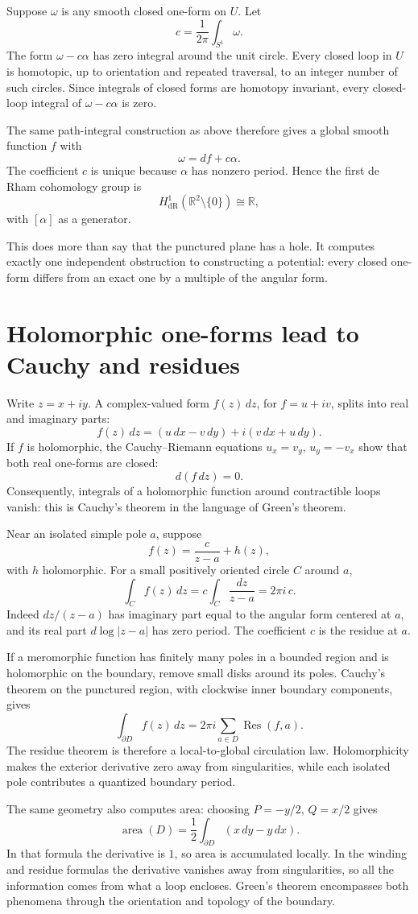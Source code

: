 Suppose \(\omega\) is any smooth closed one-form on \(U\). Let
\[
 c=\frac1{2\pi}\int_{S^1}\omega.
\]
The form \(\omega-c\alpha\) has zero integral around the unit circle. Every closed loop in \(U\) is homotopic, up to orientation and repeated traversal, to an integer number of such circles. Since integrals of closed forms are homotopy invariant, every closed-loop integral of \(\omega-c\alpha\) is zero.

The same path-integral construction as above therefore gives a global smooth function \(f\) with
\[
 \boxed{\omega=df+c\alpha.}
\]
The coefficient \(c\) is unique because \(\alpha\) has nonzero period. Hence the first de Rham cohomology group is
\[
 H^1_{\mathrm{dR}}(\mathbb R^2\setminus\{0\})\cong\mathbb R,
\]
with \([\alpha]\) as a generator.

This does more than say that the punctured plane has a hole. It computes exactly one independent obstruction to constructing a potential: every closed one-form differs from an exact one by a multiple of the angular form.

\section{Holomorphic one-forms lead to Cauchy and residues}

Write \(z=x+iy\). A complex-valued form \(f(z)\,dz\), for \(f=u+iv\), splits into real and imaginary parts:
\[
 f(z)\,dz=(u\,dx-v\,dy)+i(v\,dx+u\,dy).
\]
If \(f\) is holomorphic, the Cauchy--Riemann equations \(u_x=v_y\), \(u_y=-v_x\) show that both real one-forms are closed:
\[
 d(f\,dz)=0.
\]
Consequently, integrals of a holomorphic function around contractible loops vanish: this is Cauchy's theorem in the language of Green's theorem.

Near an isolated simple pole \(a\), suppose
\[
 f(z)=\frac{c}{z-a}+h(z),
\]
with \(h\) holomorphic. For a small positively oriented circle \(C\) around \(a\),
\[
 \int_C f(z)\,dz
 =c\int_C\frac{dz}{z-a}
 =2\pi i\,c.
\]
Indeed \(dz/(z-a)\) has imaginary part equal to the angular form centered at \(a\), and its real part \(d\log|z-a|\) has zero period. The coefficient \(c\) is the residue at \(a\).

If a meromorphic function has finitely many poles in a bounded region and is holomorphic on the boundary, remove small disks around its poles. Cauchy's theorem on the punctured region, with clockwise inner boundary components, gives
\[
 \boxed{\int_{\partial D}f(z)\,dz
 =2\pi i\sum_{a\in D}\operatorname{Res}(f,a).}
\]
The residue theorem is therefore a local-to-global circulation law. Holomorphicity makes the exterior derivative zero away from singularities, while each isolated pole contributes a quantized boundary period.

The same geometry also computes area: choosing \(P=-y/2\), \(Q=x/2\) gives
\[
 \operatorname{area}(D)=\frac12\int_{\partial D}(x\,dy-y\,dx).
\]
In that formula the derivative is \(1\), so area is accumulated locally. In the winding and residue formulas the derivative vanishes away from singularities, so all the information comes from what a loop encloses. Green's theorem encompasses both phenomena through the orientation and topology of the boundary.

